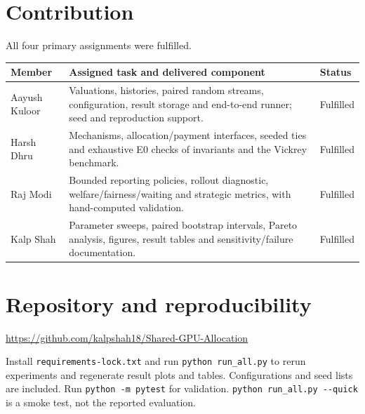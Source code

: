 \documentclass{article}
\newcommand{\repo}{\url{https://github.com/kalpshah18/Shared-GPU-Allocation}}
\begin{document}
\section{Contribution}
All four primary assignments were fulfilled.
\begin{center}\small
\begin{tabular}{p{1.05in}p{4.05in}p{0.65in}}
\toprule Member & Assigned task and delivered component & Status \\
\midrule
Aayush Kuloor & Valuations, histories, paired random streams, configuration,
result storage and end-to-end runner; seed and reproduction support. & Fulfilled \\
Harsh Dhru & Mechanisms, allocation/payment interfaces, seeded ties and exhaustive
E0 checks of invariants and the Vickrey benchmark. & Fulfilled \\
Raj Modi & Bounded reporting policies, rollout diagnostic, welfare/fairness/waiting
and strategic metrics, with hand-computed validation. & Fulfilled \\
Kalp Shah & Parameter sweeps, paired bootstrap intervals, Pareto analysis,
figures, result tables and sensitivity/failure documentation. & Fulfilled \\
\bottomrule
\end{tabular}\end{center}

\section{Repository and reproducibility}
\repo

Install \texttt{requirements-lock.txt} and run \verb|python run_all.py|
to rerun experiments and regenerate result plots and tables. Configurations
and seed lists are included. Run \verb|python -m pytest| for validation.
\verb|python run_all.py --quick| is a smoke test, not the reported evaluation.
\label{lastbodypage}

\clearpage


\end{document}

